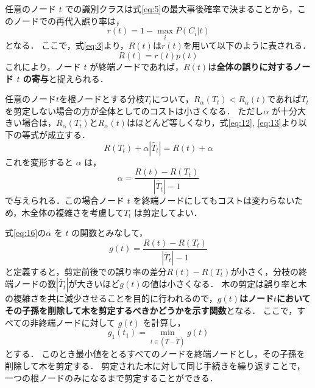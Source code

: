 \documentclass[dvipdfmx]{jreport}
\begin{document}
任意のノード $t$ での識別クラスは式\eqref{eq:5}の最大事後確率で決まることから，このノードでの再代入誤り率は，
\begin{equation}
    r(t) = 1 - \max_{i} P(C_i|t) \label{eq:14}
\end{equation}
となる．
ここで，式\eqref{eq:3}より，$R(t)$は$r(t)$を用いて以下のように表される．
\begin{equation}
    R(t) = r(t) p(t) \label{eq:15}
\end{equation}
これにより，ノード $t$ が終端ノードであれば，$R(t)$は\textbf{全体の誤りに対するノード $t$ の寄与}と捉えられる．

任意のノード$t$を根ノードとする分枝$T_t$について，$R_\alpha(T_t) < R_\alpha(t)$であれば$T_t$を剪定しない場合の方が全体としてのコストは小さくなる．
ただし$\alpha$ が十分大きい場合は，$R_\alpha(T_t)$と$R_\alpha(t)$はほとんど等しくなり，式\eqref{eq:12}, \eqref{eq:13}より以下の等式が成立する．
\begin{equation}
    R(T_t) + \alpha|\tilde{T_t}| = R(t) + \alpha \label{eq:25}
\end{equation}
これを変形すると $\alpha$ は，
\begin{equation}
    \alpha = \frac{R(t) - R(T_t)}{|\tilde{T_t}| - 1} \label{eq:16}
\end{equation}
で与えられる．この場合ノード $t$ を終端ノードにしてもコストは変わらないため，木全体の複雑さを考慮して$T_t$ は剪定してよい．

式\eqref{eq:16}の$\alpha$ を $t$ の関数とみなして，
\begin{equation}
    g(t) = \frac{R(t) - R(T_t)}{|\tilde{T_t}| - 1} \label{eq:17}
\end{equation}
と定義すると，剪定前後での誤り率の差分$R(t) - R(T_t)$が小さく，分枝の終端ノードの数$|\tilde{T_t}|$が大きいほど$g(t)$の値は小さくなる．
木の剪定は誤り率と木の複雑さを共に減少させることを目的に行われるので，\textbf{$g(t)$はノード$t$においてその子孫を削除して木を剪定するべきかどうかを示す関数}となる．
ここで，すべての非終端ノードに対して $g(t)$ を計算し，
\begin{equation}
    g_1(t_1) = \min_{t \in (T-\tilde{T})} g(t) \label{eq:18}
\end{equation}
とする．
このとき最小値をとるすべてのノードを終端ノードとし，その子孫を削除して木を剪定する．
剪定された木に対して同じ手続きを繰り返すことで，一つの根ノードのみになるまで剪定することができる．
\end{document}
